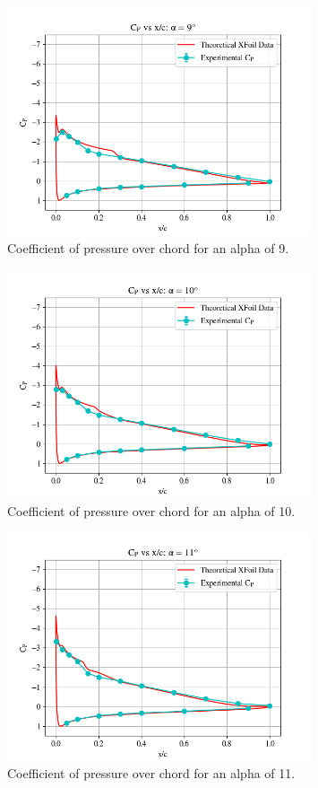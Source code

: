 \documentclass[11pt, letterpaper]{article}
\begin{document}
\begin{appendices}
\begin{figure}[!hpt]
        \centering        
        \includegraphics[width=0.8\textwidth]{Figures/C_p-a9.png}
        \caption{Coefficient of pressure over chord for an alpha of 9\degree.}
        \label{fig:C_p-a9}
\end{figure}

\begin{figure}[!hpt]
        \centering        
        \includegraphics[width=0.8\textwidth]{Figures/C_p-a10.png}
        \caption{Coefficient of pressure over chord for an alpha of 10\degree.}
        \label{fig:C_p-a10}
\end{figure}

\begin{figure}[!hpt]
        \centering        
        \includegraphics[width=0.8\textwidth]{Figures/C_p-a11.png}
        \caption{Coefficient of pressure over chord for an alpha of 11\degree.}
        \label{fig:C_p-a11}
\end{figure}


\end{appendices}
\end{document}

